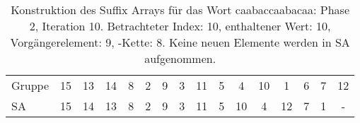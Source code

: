 \begin{table}[H]
\begin{adjustbox}{max width=\textwidth}
\begin{tabular}{lccccccccccccccc}
\multicolumn{1}{l|}{Gruppe}  & \multicolumn{1}{c|}{15} & 13 & \multicolumn{1}{c|}{14} & \multicolumn{1}{c|}{8}     & \multicolumn{1}{c|}{2}      & \multicolumn{1}{c|}{9}    & \multicolumn{1}{c|}{3}     & \multicolumn{1}{c|}{11} & \multicolumn{1}{c|}{5}   & 4                          & \multicolumn{1}{c|}{10} & 1   & 6   & 7   & 12  \\
\multicolumn{1}{l|}{SA}      & \multicolumn{1}{c|}{15} & 14 & \multicolumn{1}{c|}{13} & \multicolumn{1}{c|}{8}     & \multicolumn{1}{c|}{2}      & \multicolumn{1}{c|}{9}    & \multicolumn{1}{c|}{3}     & \multicolumn{1}{c|}{11} & \multicolumn{1}{c|}{5}   & \cellcolor[HTML]{\green}10 & \multicolumn{1}{c|}{4}  & 12  & 7   & 1   & -  
\end{tabular}
\end{adjustbox}

\caption[Konstruktion des Suffix Arrays f{\"u}r das Wort caabaccaabacaa: Phase 2, Iteration 10]{Konstruktion des Suffix Arrays f{\"u}r das Wort caabaccaabacaa: Phase 2, Iteration 10. Betrachteter Index: 10, enthaltener Wert: 10, Vorg{\"a}ngerelement: 9, \prevpointer-Kette: 8. Keine neuen Elemente werden in SA aufgenommen.} 
\label{table_complex_example_2_10} 
\end{table}

